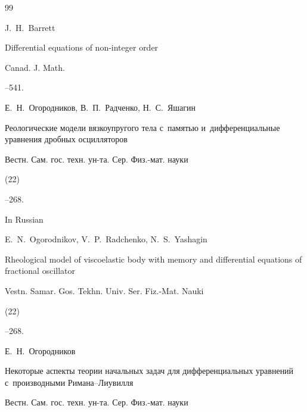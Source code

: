 \begin{thebibliography}{99}

\by J.~H.~Barrett

\paper Differential equations of non-integer order 

\jour Canad. J. Math.




--541.











\by Е.~Н.~Огородников, В.~П.~Радченко, Н.~С.~Яшагин

\paper Реологические модели вязкоупругого тела с~памятью и~дифференциальные уравнения дробных осцилляторов

\jour Вестн. Сам. гос. техн. ун-та. Сер. Физ.-мат. науки


(22)

--268.



\misctransl

\lang In Russian

\by E.~N.~Ogorodnikov, V.~P.~Radchenko, N.~S.~Yashagin

\paper Rheological model of viscoelastic  body with memory and differential equations of fractional oscillator

\jour Vestn. Samar. Gos. Tekhn. Univ. Ser. Fiz.-Mat. Nauki


(22)

--268.








\by Е.~Н.~Огородников

\paper Некоторые аспекты теории начальных задач для дифференциальных уравнений с~производными Римана--Лиувилля

\jour Вестн. Сам. гос. техн. ун-та. Сер. Физ.-мат. науки



\end{thebibliography}
